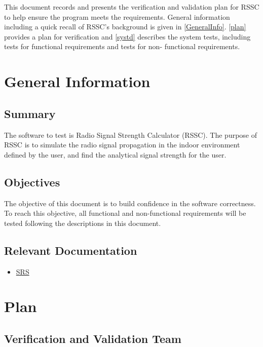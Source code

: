 \documentclass[12pt, titlepage]{article}
\begin{document}

This document records and presents the verification and validation plan for RSSC
to help ensure the program meets the requirements. General information including
a quick recall of RSSC's background is given in \autoref{GeneralInfo}. 
\autoref{plan} provides a plan for verification and \autoref{systd} describes 
the system tests, including tests for functional requirements and tests for non-
functional requirements.


\section{General Information}
\label{GeneralInfo}

\subsection{Summary}

The software to test is Radio Signal Strength Calculator (RSSC). The purpose of
RSSC is to simulate the radio signal propagation in the indoor environment defined
by the user, and find the analytical signal strength for the user. 

\subsection{Objectives}

The objective of this document is to build confidence in the software correctness.
To reach this objective, all functional and non-functional requirements will be
tested following the descriptions in this document. 

\subsection{Relevant Documentation}

\begin{itemize}
	\item 
	\href{https://github.com/XingzhiMac/CAS741-Proj/blob/master/docs/SRS/SRS.pdf}
	{SRS} 
\end{itemize}

\section{Plan}\label{plan}
	
\subsection{Verification and Validation Team}
\end{document}
